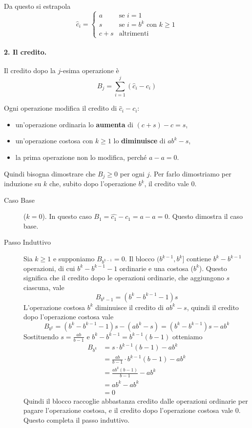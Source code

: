 Da questo si estrapola
\begin{equation}
    \hat{c}_i =
    \begin{cases}
        a & \text{se } i=1 \\
        s & \text{se } i = b^k \text{ con } k \ge 1 \\
        c+s & \text{altrimenti}
    \end{cases}
\end{equation}

\paragraph{2. Il credito.}
Il credito dopo la $j$-esima operazione è
\[
B_j = \sum_{i=1}^j (\hat{c}_i - c_i)
\]

\noindent
Ogni operazione modifica il credito di $\hat{c}_i - c_i$:
\begin{itemize}
    \item un'operazione ordinaria lo \textbf{aumenta} di $(c+s)-c = s$,
    \item un'operazione costosa con $k \ge 1$ lo \textbf{diminuisce} di $ab^k -s$,
    \item la prima operazione non lo modifica, perché $a - a = 0$.
\end{itemize}

\noindent
Quindi bisogna dimostrare che $B_j \ge 0$ per ogni $j$. Per farlo dimostriamo per induzione su $k$ che, subito dopo l'operazione $b^k$, il credito vale $0$.
\begin{description}
    \item[Caso Base] ($k=0$). In questo caso $B_1 = \hat{c_1} - c_1 = a- a = 0$. Questo dimostra il caso base. 
    \item[Passo Induttivo] Sia $k \ge 1$ e supponiamo $B_{b^{k-1}} = 0$. Il blocco $(b^{k-1}, b^k]$ contiene $b^k - b^{k-1}$ operazioni, di cui $b^k - b^{k-1} - 1$ ordinarie e una costosa ($b^k$). Questo significa che il credito dopo le operazioni ordinarie, che aggiungono $s$ ciascuna, vale
    \[
    B_{b^k-1} = (b^k - b^{k-1}-1)s
    \]
    L'operazione costosa $b^k$ diminuisce il credito di $ab^k - s$, quindi il credito dopo l'operazione costosa vale
    \[
    B_{b^k} = (b^k - b^{k-1}-1)s - (ab^k - s) = (b^k - b^{k-1})s - ab^k
    \]
    Sostituendo $s = \frac{ab}{b-1}$ e $b^k - b^{k-1} = b^{k-1}(b-1)$ otteniamo
    \begin{align*}
        B_{b^k} &= s \cdot b^{k-1}(b-1) - ab^k \\
        &= \frac{ab}{b-1} \cdot b^{k-1}(b-1) - ab^k \\
        &= \frac{ab^k(b-1)}{b-1} - ab^k \\
        &= ab^k - ab^k \\
        &= 0
    \end{align*}
    Quindi il blocco raccoglie abbastanza credito dalle operazioni ordinarie per pagare l'operazione costosa, e il credito dopo l'operazione costosa vale $0$. Questo completa il passo induttivo.
\end{description}

